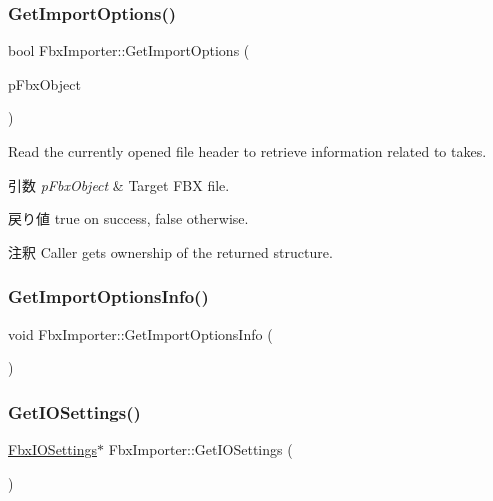 \subsubsection{\texorpdfstring{Get\+Import\+Options()}{GetImportOptions()}\hspace{0.1cm}{\footnotesize\ttfamily [2/2]}}
{\footnotesize\ttfamily bool Fbx\+Importer\+::\+Get\+Import\+Options (\begin{DoxyParamCaption}\item[{\hyperlink{class_fbx_i_o}{Fbx\+IO} $\ast$}]{p\+Fbx\+Object }\end{DoxyParamCaption})}

Read the currently opened file header to retrieve information related to takes. 
\begin{DoxyParams}{引数}
{\em p\+Fbx\+Object} & Target F\+BX file. \\
\hline
\end{DoxyParams}
\begin{DoxyReturn}{戻り値}
{\ttfamily true} on success, {\ttfamily false} otherwise. 
\end{DoxyReturn}
\begin{DoxyRemark}{注釈}
Caller gets ownership of the returned structure. 
\end{DoxyRemark}
\mbox{\label{class_fbx_importer_a2d4879dada04a1ad2e41617de6538d2e}} 
\subsubsection{\texorpdfstring{Get\+Import\+Options\+Info()}{GetImportOptionsInfo()}}
{\footnotesize\ttfamily void Fbx\+Importer\+::\+Get\+Import\+Options\+Info (\begin{DoxyParamCaption}{ }\end{DoxyParamCaption})\hspace{0.3cm}{\ttfamily [protected]}}

\mbox{\label{class_fbx_importer_a864398459eef6683640812b9b82f92c9}} 
\subsubsection{\texorpdfstring{Get\+I\+O\+Settings()}{GetIOSettings()}}
{\footnotesize\ttfamily \hyperlink{class_fbx_i_o_settings}{Fbx\+I\+O\+Settings}$\ast$ Fbx\+Importer\+::\+Get\+I\+O\+Settings (\begin{DoxyParamCaption}{ }\end{DoxyParamCaption})}

